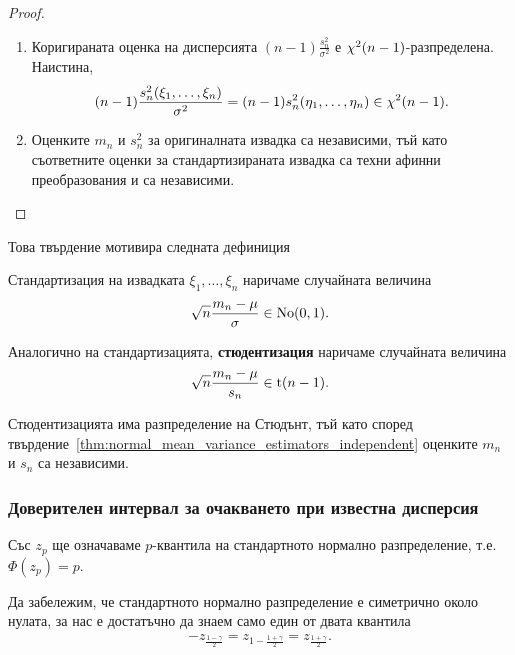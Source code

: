 \documentclass[numbers=endperiod, bibliography=totocnumbered]{scrartcl}
\begin{document}
\begin{proof}
\begin{enumerate}
    \item Коригираната оценка на дисперсията \( (n-1) \frac {s_n^2} {\sigma^2} \) е \( \operatorname{\chi^2}(n-1) \)-разпределена. Наистина,
    \begin{align*}
      (n-1) \frac {s_n^2(\xi_1, \ldots, \xi_n)} {\sigma^2}
      =
      (n-1) s_n^2(\eta_1, \ldots, \eta_n)
      \in
      \operatorname{\chi^2}(n - 1).
    \end{align*}

    \item Оценките \( m_n \) и \( s_n^2 \) за оригиналната извадка са независими, тъй като съответните оценки за стандартизираната извадка са техни афинни преобразования и са независими.
  \end{enumerate}
\end{proof}

Това твърдение мотивира следната дефиниция
\begin{definition}
  Стандартизация на извадката \( \xi_1, \ldots, \xi_n \) наричаме случайната величина
  \begin{align*}
    \sqrt n \frac {m_n - \mu} \sigma \in \operatorname{No}(0, 1).
  \end{align*}

  Аналогично на стандартизацията, \textbf{стюдентизация} наричаме случайната величина
  \begin{align*}
    \sqrt n \frac {m_n - \mu} {s_n} \in \operatorname{t}(n - 1).
  \end{align*}
\end{definition}

\begin{remark}
  Стюдентизацията има разпределение на Стюдънт, тъй като според твърдение~\ref{thm:normal_mean_variance_estimators_independent} оценките \( m_n \) и \( s_n \) са независими.
\end{remark}

\subsubsection{Доверителен интервал за очакването при известна дисперсия}

Със \( z_p \) ще означаваме \( p \)-квантила на стандартното нормално разпределение, т.е. \( \Phi(z_p) = p \).

Да забележим, че стандартното нормално разпределение е симетрично около нулата, за нас е достатъчно да знаем само един от двата квантила
\begin{align*}
  -z_{\frac {1-\gamma} 2}
  =
  z_{1-\frac {1+\gamma} 2}
  =
  z_{\frac {1+\gamma} 2}.
\end{align*}
\end{document}
